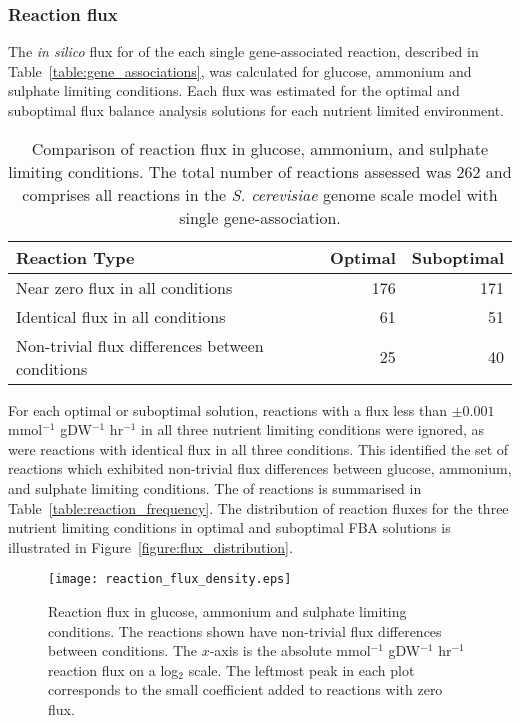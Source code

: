 \subsubsection{Reaction flux}%

The \emph{in silico} flux for of the each single gene-associated reaction, described in Table~\vref{table:gene_associations}, was calculated for glucose, ammonium and sulphate limiting conditions. Each flux was estimated for the optimal and suboptimal flux balance analysis solutions for each nutrient limited environment.

\begin{table}[b]%
  \centering
  \begin{tabular}{l r r}
                                                                              \toprule
    Reaction Type                                   & Optimal & Suboptimal \\ \midrule
    Near zero flux in all conditions                & 176     & 171        \\
    Identical flux in all conditions                & 61      & 51         \\
    Non-trivial flux differences between conditions & 25      & 40         \\ \bottomrule
  \end{tabular}
  \caption[Comparison of reaction flux across environments]{Comparison of reaction flux in glucose, ammonium, and sulphate limiting conditions. The total number of reactions assessed was 262 and comprises all reactions in the \emph{S. cerevisiae} genome scale model with single gene-association. }
  \label{table:reaction_frequency}
\end{table}%

For each optimal or suboptimal solution, reactions with a flux less than $\pm0.001$ mmol$^{-1}$ gDW$^{-1}$ hr$^{-1}$ in all three nutrient limiting conditions were ignored, as were reactions with identical flux in all three conditions. This identified the set of reactions which exhibited non-trivial flux differences between glucose, ammonium, and sulphate limiting conditions. The of reactions is summarised in Table~\vref{table:reaction_frequency}. The distribution of reaction fluxes for the three nutrient limiting conditions in optimal and suboptimal FBA solutions is illustrated in Figure~\vref{figure:flux_distribution}.

\begin{figure}%
  \centering
  \texttt{[image: reaction\_flux\_density.eps]}
  \caption[Reaction flux in glucose, ammonium and sulphate limitation]{Reaction flux in glucose, ammonium and sulphate limiting conditions. The reactions shown have non-trivial flux differences between conditions. The $x$-axis is the absolute mmol$^{-1}$ gDW$^{-1}$ hr$^{-1}$ reaction flux on a log$_2$ scale. The leftmost peak in each plot corresponds to the small coefficient added to reactions with zero flux. }
  \label{figure:flux_distribution}
\end{figure}%

